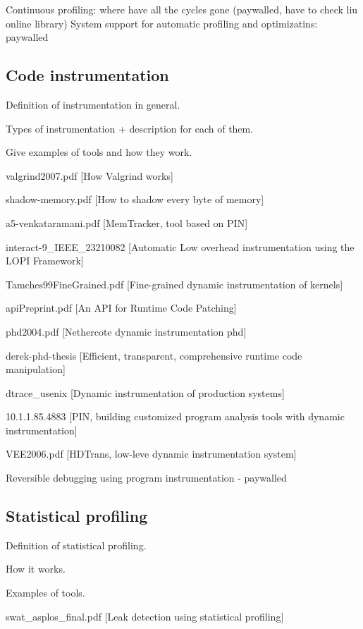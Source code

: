 Continuous profiling: where have all the cycles gone (paywalled, have to check liu online library)
System support for automatic profiling and optimizatins: paywalled

\subsection{Code instrumentation}
\label{subsection:codeinstrumentation}

Definition of instrumentation in general.

Types of instrumentation + description for each of them.

Give examples of tools and how they work.

valgrind2007.pdf [How Valgrind works]

shadow-memory.pdf [How to shadow every byte of memory]

a5-venkataramani.pdf [MemTracker, tool based on PIN]

interact-9\_IEEE\_23210082 [Automatic Low overhead instrumentation using the LOPI Framework]

Tamches99FineGrained.pdf [Fine-grained dynamic instrumentation of kernels]

apiPreprint.pdf [An API for Runtime Code Patching]

phd2004.pdf [Nethercote dynamic instrumentation phd]

derek-phd-thesis [Efficient, transparent, comprehensive runtime code manipulation]

dtrace\_usenix [Dynamic instrumentation of production systems]

10.1.1.85.4883 [PIN, building customized program analysis tools with dynamic instrumentation]

VEE2006.pdf [HDTrans, low-leve dynamic instrumentation system]

Reversible debugging using program instrumentation - paywalled

\subsection{Statistical profiling}
\label{subsection:statisticalprofiling}

Definition of statistical profiling.

How it works.

Examples of tools.

swat\_asplos\_final.pdf [Leak detection using statistical profiling]

